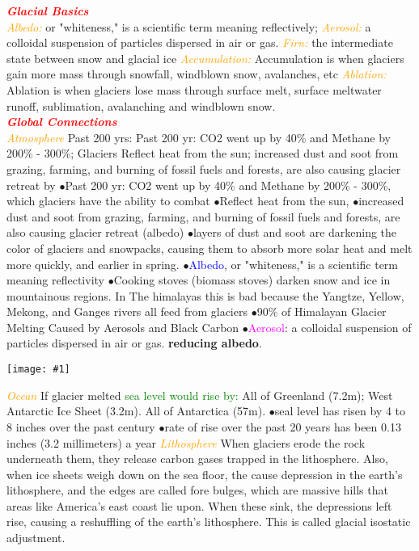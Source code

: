 \documentclass{article}
\author{SBHS Science Olympiad, Gold}
\newcommand{\ddd}{$\bullet$}
\newcommand{\red}[1]{\textcolor{red}{#1}}
\newcommand{\green}[1]{\textcolor{green}{#1}}
\newcommand{\blue}[1]{\textcolor{blue}{#1}}
\newcommand{\pink}[1]{\textcolor{magenta}{#1}}
\newcommand{\orange}[1]{\textcolor{orange}{#1}}
\newcommand{\firstmysection}[1]{\textbf{\textit{\red{#1}}} \\}
\newcommand{\mysection}[1]{\\ \textbf{\textit{\red{#1}}} \\}
\newcommand{\mysub}[1]{{\textit{\orange{#1}}}}
\newcommand{\mysubsub}[1]{{{\green{#1}}}}
\newcommand{\vocab}[1]{{\pink{#1}}}
\newcommand{\fig}[1]{
	\texttt{[image: \#1]}
}
\begin{document}
	 \small
	\begin{multicols*}{4}
		\firstmysection{Glacial Basics}
		\mysub{Albedo:} or "whiteness," is a scientific term meaning reflectively;
		\mysub{Aerosol:} a colloidal suspension of particles dispersed in air or gas.
		\mysub{Firn:} the intermediate state between snow and glacial ice
		\mysub{Accumulation:} Accumulation is when glaciers gain more mass through snowfall, windblown snow, avalanches, etc
		\mysub{Ablation:} Ablation is when glaciers lose mass through surface melt, surface meltwater runoff, sublimation, avalanching and windblown snow.
         \mysection{Global Connections}
		\mysub{Atmosphere}
		Past 200 yrs: Past 200 yr: CO2 went up by 40\% and Methane by 200\% - 300\%; Glaciers Reflect heat from the sun; increased dust and soot from grazing, farming, and burning of fossil fuels and forests, are also causing glacier retreat by
		 \ddd Past 200 yr: CO2 went up by 40\% and Methane by 200\% - 300\%, which glaciers have the ability to combat
       \ddd Reflect heat from the sun, 
        \ddd increased dust and soot from grazing, farming, and burning of fossil fuels and forests, are also causing glacier retreat (albedo)
        \ddd layers of dust and soot are darkening the color of glaciers and snowpacks, causing them to absorb more solar heat and melt more quickly, and earlier in spring.
        \ddd \blue{Albedo}, or "whiteness," is a scientific term meaning reflectivity
        \ddd Cooking stoves (biomass stoves) darken snow and ice in mountainous regions. In The himalayas this is bad because the Yangtze, Yellow, Mekong, and Ganges rivers all feed from glaciers
        \ddd 90\% of Himalayan Glacier Melting Caused by Aerosols and Black Carbon
        \ddd \vocab{Aerosol}: a colloidal suspension of particles dispersed in air or gas.
		\textbf{reducing albedo}.
		\fig{NOAASeaLevel}
		\mysub{Ocean} If glacier melted 
		\mysubsub{sea level would rise by: } All of Greenland (7.2m); West Antarctic Ice Sheet (3.2m). All of Antarctica (57m). 
         \ddd seal level has risen by 4 to 8 inches over the past century
         \ddd rate of rise over the past 20 years has been 0.13 inches (3.2 millimeters) a year
		\mysub{Lithosphere} When glaciers erode the rock underneath them, they release carbon gases trapped in the lithosphere. Also, when ice sheets weigh down on the sea floor, the cause depression in the earth's lithosphere, and the edges are called fore bulges, which are massive hills that areas like America's east coast lie upon. When these sink, the depressions left rise, causing a reshuffling of the earth's lithosphere. This is called glacial isostatic adjustment.

\end{multicols*}
\end{document}
